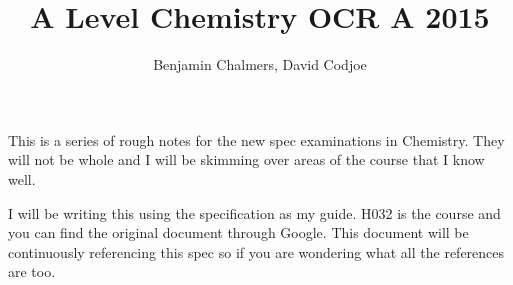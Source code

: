 \documentclass[11pt,a4paper]{memoir}
\author{Benjamin Chalmers, David Codjoe}
\title{A Level Chemistry OCR A 2015}
\begin{document}
\frontmatter
\maketitle
\newpage
	This is a series of rough notes for the new spec examinations in Chemistry.
	They will not be whole and I will be skimming over areas of the course that I know well.
	
	I will be writing this using the specification as my guide.
	H032 is the course and you can find the original document through Google.
	This document will be continuously referencing this spec so if you are wondering what all the references are too.
\newpage
\tableofcontents
\mainmatter


	

	







\end{document}
